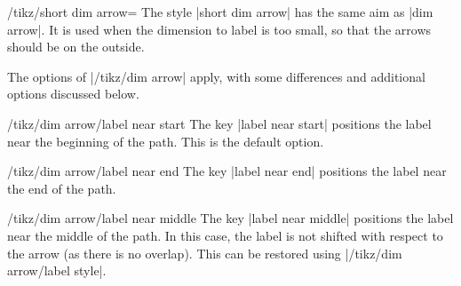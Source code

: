\documentclass[a4paper]{ltxdoc}
\begin{document}
\begin{stylekey}{/tikz/short dim arrow=}
  The style |short dim arrow| has the same aim as |dim arrow|. It is used when the dimension to label is too small, so that the arrows should be on the outside.

  \begin{codeexample}[width=4cm]
  \end{codeexample}

  The options of |/tikz/dim arrow| apply, with some differences and additional options discussed below.

  \begin{key}{/tikz/dim arrow/label near start}
  The key |label near start| positions the label near the beginning of the path.
  This is the default option.

\begin{codeexample}[]
\end{codeexample}
  \end{key}

  \begin{key}{/tikz/dim arrow/label near end}
  The key |label near end| positions the label near the end of the path.

\begin{codeexample}[]
\end{codeexample}
  \end{key}

  \begin{key}{/tikz/dim arrow/label near middle}
  The key |label near middle| positions the label near the middle of the path.
  In this case, the label is not shifted with respect to the arrow (as there is no overlap). 
  This can be restored using |/tikz/dim arrow/label style|.


\end{key}
\end{stylekey}
\end{document}
